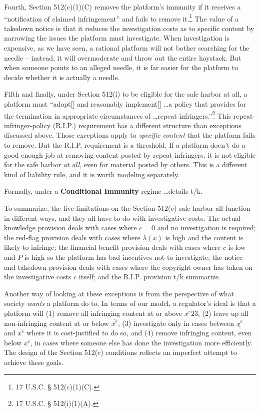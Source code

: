 Fourth, Section 512(c)(1)(C) removes the platform's immunity if it receives a ``notification of claimed infringement'' and fails to remove it.\footnote{17 U.S.C. § 512(c)(1)(C).} The value of a takedown notice is that it reduces the investigation costs as to specific content by narrowing the issues the platform must investigate. When investigation is expensive, as we have seen, a rational platform will not bother searching for the needle -- instead, it will overmoderate and throw out the entire haystack. But when someone points to an alleged needle, it is far easier for the platform to decide whether it is actually a needle.






Fifth and finally, under Section 512(i) to be eligible for the safe harbor at all, a platform must ``adopt[] and reasonably implement[] \ldots a policy that provides for the termination in appropriate circumstances of \ldots repeat infringers.''\footnote{17 U.S.C. § 512(i)(1)(A).} This repeat-infringer-policy (R.I.P.) requirement has a different structure than exceptions discussed above. Those exceptions apply to \emph{specific content} that the platform fails to remove. But the R.I.P. requirement is a threshold. If a platform doen't do a good enough job at removing content posted by repeat infringers, it is not eligible for the safe harbor \emph{at all}, even for material posted by others. This is a different kind of liability rule, and it is worth modeling separately. 

Formally, under a \textbf{Conditional Immunity} regime \ldots details t/k.

To summarize, the five limitations on the Section 512(c) safe harbor all function in different ways, and they all have to do with investigative costs. The actual-knowledge provision deals with cases where $c = 0$ and no investigation is required; the red-flag provision deals with cases where $\lambda(x)$ is high and the content is likely to infringe; the financial-benefit provision deals with cases where $c$ is low and $P$ is high so the platform has bad incentives not to investigate; the notice-and-takedown provision deals with cases where the copyright owner has taken on the investigative costs $c$ itself; and the R.I.P. provision t/k summarize.

Another way of looking at these exceptions is from the perspective of what society \emph{wants} a platform do to. In terms of our model, a regulator's ideal is that a platform will (1) remove all infringing content at or above $\underline{x^e}23$, (2) leave up all non-infringing content at or below $\overline{x^e}$, (3) investigate only in cases between $\underline{x^e}$ and $\overline{x^e}$ where it is cost-justified to do so, and (4) remove infringing content, even below $\underline{x^e}$, in cases where someone else has done the investigation more efficiently. The design of the Section 512(c) conditions reflects an imperfect attempt to achieve these goals.




